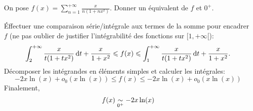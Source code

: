 \begin{exercice}
    On pose $f(x) = \sum\limits_{n=1}^{+\infty}\frac{x}{n(1+nx^2)}$. Donner un équivalent de $f$ et $0^+$.
\end{exercice}

\begin{solution}
    Éffectuer une comparaison série/intégrale aux termes de la somme pour encadrer $f$ (ne pas oublier de justifier l'intégrabilité des fonctions sur $[1, +\infty[$):
    $$\int_{2}^{+\infty} \frac{x}{t(1+tx^2)} \, \mathrm{d} t + \frac{x}{1+x^2} \leqslant f(x) \leqslant \int_{1}^{+\infty} \frac{x}{t(1+tx^2)} \, \mathrm{d} t + \frac{x}{1+x^2}.$$ 
    Décomposer les intégrandes en éléments simples et calculer les intégrales:
    $$-2x \ln(x) + o_0(x\ln(x)) \leqslant f(x) \leqslant -2x \ln(x) + o_0(x\ln(x))$$
    Finalement, 
    $$f(x) \isEquivTo{0^+} -2x\ln(x)$$
\end{solution}